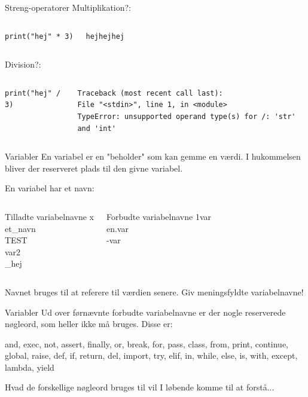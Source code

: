 \documentclass{beamer}
\begin{document}
\begin{frame}[fragile]{Streng-operatorer}
Multiplikation?:
\begin{columns}
\begin{lstlisting}[style=python]
print("hej" * 3)
\end{lstlisting}
\pause
{}
\begin{lstlisting}[style=python]
hejhejhej
\end{lstlisting}
\end{columns}
\pause
Division?:
\begin{columns}
\begin{lstlisting}[style=python]
print("hej" / 3)
\end{lstlisting}
\pause
{}
\begin{lstlisting}[style=python]
Traceback (most recent call last):
File "<stdin>", line 1, in <module>
TypeError: unsupported operand type(s) for /: 'str' and 'int'
\end{lstlisting}
\end{columns}
\end{frame}


\begin{frame}{Variabler}
En variabel er en "beholder" som kan gemme en værdi. I hukommelsen bliver der reserveret plads til den givne variabel.


En variabel har et navn:
\begin{columns}
	\begin{exampleblock}{Tilladte variabelnavne}
		x\\et\_navn\\TEST\\var2\\\_hej
	\end{exampleblock}
	
	\begin{alertblock}{Forbudte variabelnavne}
		1var\\en.var\\-var
	\end{alertblock}
\end{columns}

Navnet bruges til at referere til værdien senere.
\vfill
Giv meningsfyldte variabelnavne!
\end{frame}

\begin{frame}{Variabler}
Ud over førnævnte forbudte variabelnavne er der nogle reserverede nøgleord, som heller ikke må bruges.
\vfill
Disse er: \\
\begin{Large}
and, exec, not, assert,	finally, or, break, for, pass, class, from, print, continue, global, raise, def, if, return, del, import, try, elif, in, while, else, is, with, except, lambda,	yield		
\end{Large}
\vfill
Hvad de forskellige nøgleord bruges til vil I løbende komme til at forstå...
\end{frame}
\end{document}
